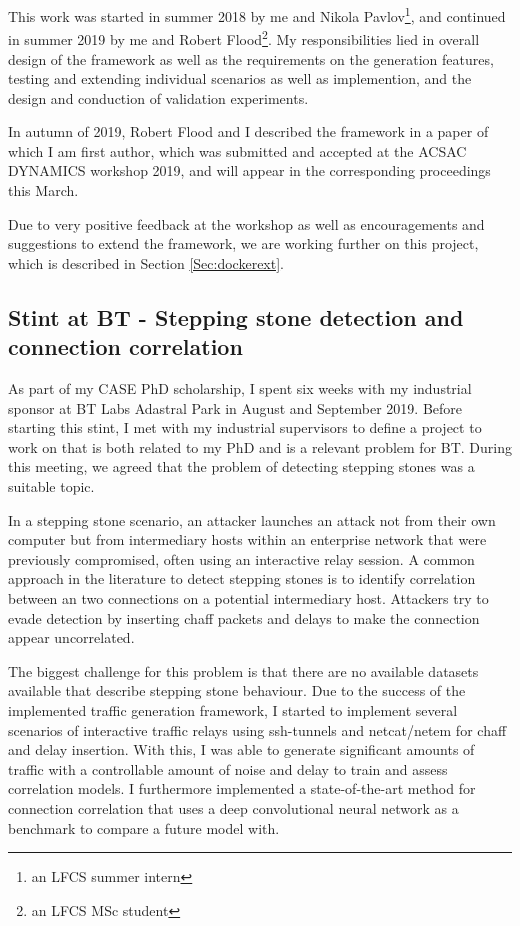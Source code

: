 \documentclass[a4paper,12pt,twoside]{article}
\begin{document}
This work was started in summer 2018 by me and Nikola Pavlov\footnote{an LFCS summer intern}, and continued in summer 2019 by me and Robert Flood\footnote{an LFCS MSc student}. My responsibilities lied in overall design of the framework as well as the requirements on the generation features, testing and extending individual scenarios as well as implemention, and the design and conduction of validation experiments. 

In autumn of 2019, Robert Flood and I described the framework in a paper of which I am first author, which was submitted and accepted at the ACSAC DYNAMICS workshop 2019, and will appear in the corresponding proceedings this March. 

Due to very positive feedback at the workshop as well as encouragements and suggestions to extend the framework, we are working further on this project, which is described in Section \ref{Sec:dockerext}.

\subsection{Stint at BT - Stepping stone detection and connection correlation}\label{Sec:BTstint}

As part of my CASE PhD scholarship, I spent six weeks with my industrial sponsor at BT Labs Adastral Park in August and September 2019. Before starting this stint, I met with my industrial supervisors to define a project to work on that is both related to my PhD and is a relevant problem for BT. During this meeting, we agreed that the problem of detecting stepping stones was a suitable topic. 

In a stepping stone scenario, an attacker launches an attack not from their own computer but from intermediary hosts within an enterprise network that were previously compromised, often using an interactive relay session. A common approach in the literature to detect stepping stones is to identify correlation between an two connections on a potential intermediary host. Attackers try to evade detection by inserting chaff packets and delays to make the connection appear uncorrelated.

The biggest challenge for this problem is that there are no available datasets available that describe stepping stone behaviour. Due to the success of the implemented traffic generation framework, I started to implement several scenarios of interactive traffic relays using ssh-tunnels and netcat/netem for chaff and delay insertion. With this, I was able to generate significant amounts of traffic with a controllable amount of noise and delay to train and assess correlation models. 
I furthermore implemented a state-of-the-art method for connection correlation \cite{nasr2018deepcorr} that uses a deep convolutional neural network as a benchmark to compare a future model with. 
\end{document}
